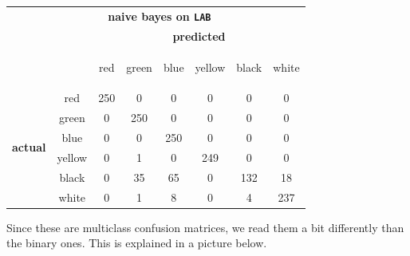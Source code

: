 \documentclass[12pt,a4paper]{article}
\begin{document}
	\begin{center}
		\begin{tabular}{|c c c c c c c c|}
			\hline
			\multicolumn{1}{|c}{} & \multicolumn{6}{c}{\multirow{2}{*}{\textbf{\large naive bayes on \texttt{LAB}}}} & \multicolumn{1}{c|}{}\\
			\multicolumn{1}{|c}{} & & & & & & & \multicolumn{1}{c|}{}\\
			\hline
				& & \multicolumn{6}{|c|}{\textbf{predicted}} \\
				\multicolumn{2}{|c|}{}& \begin{sideways}red\end{sideways} & \begin{sideways}green\end{sideways} & \begin{sideways}blue\end{sideways} & \begin{sideways}yellow \end{sideways} & \begin{sideways}black\end{sideways} & \begin{sideways}white\end{sideways} \\ \hline
			\multirow{6}{*}{\begin{sideways}\textbf{actual}\end{sideways}}& \multicolumn{1}{c|}{red} &250 & 0 & 0 & 0 & 0 & 0 \\
			&\multicolumn{1}{c|}{green} & 0 & 250 & 0 & 0 & 0 & 0 \\
			&\multicolumn{1}{c|}{blue} & 0 & 0 & 250 & 0 & 0 & 0 \\
			&\multicolumn{1}{c|}{yellow} & 0 & 1 & 0 & 249 & 0 & 0 \\
			&\multicolumn{1}{c|}{black} & 0 & 35 & 65 & 0 & 132 & 18 \\
			&\multicolumn{1}{c|}{white} & 0 & 1 & 8 & 0 & 4 & 237 \\ \hline
		\end{tabular}
	\end{center}

	Since these are multiclass confusion matrices, we read them a bit differently than the binary ones. This is explained in a picture below.
\end{document}

